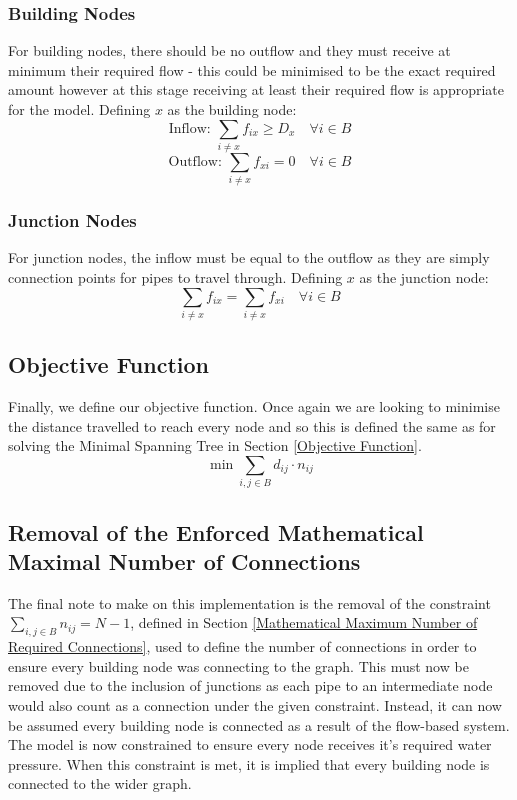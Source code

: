 \subsubsection{Building Nodes}
For building nodes, there should be no outflow and they must receive at minimum their required flow - this could be minimised to be the exact required amount however at this stage receiving at least their required flow is appropriate for the model.\newline
Defining $x$ as the building node:
\[
\text{Inflow: }\sum_{i\neq x}f_{ix} \geq D_x \quad\forall i \in B
\]
\[
\text{Outflow: }\sum_{i\neq x}f_{xi} = 0 \quad\forall i \in B
\]

\subsubsection{Junction Nodes}
For junction nodes, the inflow must be equal to the outflow as they are simply connection points for pipes to travel through.
Defining $x$ as the junction node:
\[
\sum_{i\neq x} f_{ix}= \sum_{i\neq x}f_{xi} \quad\forall i \in B
\]

\subsection{Objective Function}
Finally, we define our objective function. Once again we are looking to minimise the distance travelled to reach every node and so this is defined the same as for solving the Minimal Spanning Tree in Section \ref{Objective Function}.
\[
\min\sum_{i,j\in B}d_{ij}\cdot n_{ij}
\]
\subsection{Removal of the Enforced Mathematical Maximal Number of Connections}
The final note to make on this implementation is the removal of the constraint $\sum_{i,j \in B}n_{ij} =N -1$, defined in Section \ref{Mathematical Maximum Number of Required Connections}, used to define the number of connections in order to ensure every building node was connecting to the graph. This must now be removed due to the inclusion of junctions as each pipe to an intermediate node would also count as a connection under the given constraint. Instead, it can now be assumed every building node is connected as a result of the flow-based system. The model is now constrained to ensure every node receives it's required water pressure. When this constraint is met, it is implied that every building node is connected to the wider graph.

